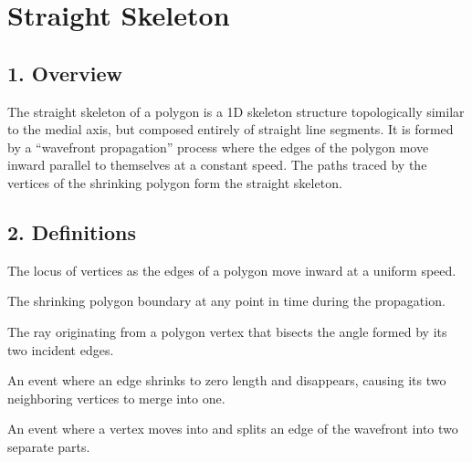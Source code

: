 \section{Straight Skeleton}
\label{sec:straight_skeleton}

\subsection{1. Overview}

The straight skeleton of a polygon is a 1D skeleton structure topologically similar to the medial axis, but composed entirely of straight line segments. It is formed by a ``wavefront propagation'' process where the edges of the polygon move inward parallel to themselves at a constant speed. The paths traced by the vertices of the shrinking polygon form the straight skeleton.

\subsection{2. Definitions}

\begin{definition}\label{def:straight_skeleton}
The locus of vertices as the edges of a polygon move inward at a uniform speed.
\end{definition}

\begin{definition}[Wavefront]\label{def:wavefront}
The shrinking polygon boundary at any point in time during the propagation.
\end{definition}

\begin{definition}[Bisector]\label{def:bisector_skeleton}
The ray originating from a polygon vertex that bisects the angle formed by its two incident edges.
\end{definition}

\begin{definition}\label{def:edge_event}
An event where an edge shrinks to zero length and disappears, causing its two neighboring vertices to merge into one.
\end{definition}

\begin{definition}\label{def:split_event}
An event where a vertex moves into and splits an edge of the wavefront into two separate parts.
\end{definition}

